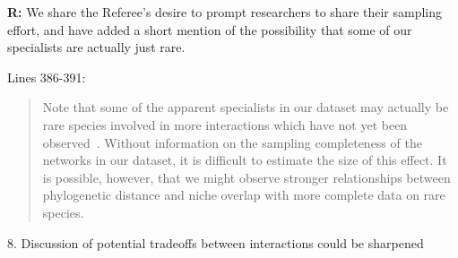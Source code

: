 \documentclass[12pt]{letter}
\begin{document}
		\textbf{R:} We share the Referee's desire to prompt researchers to share their sampling effort, and have added a short mention of the possibility  that some of our specialists are actually just rare.


		Lines 386-391:


		\begin{quotation}

			Note that some of the apparent specialists in our dataset may actually be rare species involved in more interactions which have not yet been observed~\citep{Bluthgen2006,Poisot2015}. Without information on the sampling completeness of the networks in our dataset, it is difficult to estimate the size of this effect. 
			It is possible, however, that we might observe stronger relationships between phylogenetic
			distance and niche overlap with more complete data on rare species.

		\end{quotation}


	8. Discussion of potential tradeoffs between interactions could be sharpened
\end{document}
